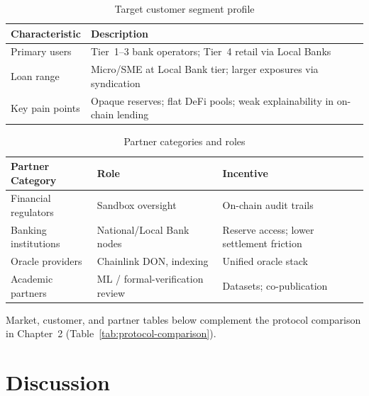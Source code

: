 \documentclass[12pt, a4paper]{report}
\newcommand{\tableheadcolor}{\rowcolor{TableHeadBg}}
\begin{document}
\vspace{2pt}

\begin{table}[H]
\centering
\caption[Target customer segment profile]{Target customer segment profile}
\label{tab:customer-segment-ch5}
\begin{tabular}{p{3.5cm}p{10cm}}
\toprule
\tableheadcolor
\textbf{Characteristic} & \textbf{Description} \\
\midrule
Primary users & Tier~1--3 bank operators; Tier~4 retail via Local Banks \\
Loan range & Micro/SME at Local Bank tier; larger exposures via syndication \\
Key pain points & Opaque reserves; flat DeFi pools; weak explainability in on-chain lending \\
\bottomrule
\end{tabular}
\end{table}

\vspace{2pt}

\begin{table}[H]
\centering
\caption[Partner categories and roles]{Partner categories and roles}
\label{tab:partner-categories-ch5}
\begin{tabular}{p{3.5cm}p{4.5cm}p{5.5cm}}
\toprule
\tableheadcolor
\textbf{Partner Category} & \textbf{Role} & \textbf{Incentive} \\
\midrule
Financial regulators & Sandbox oversight & On-chain audit trails \\
Banking institutions & National/Local Bank nodes & Reserve access; lower settlement friction \\
Oracle providers & Chainlink DON, indexing & Unified oracle stack \\
Academic partners & ML / formal-verification review & Datasets; co-publication \\
\bottomrule
\end{tabular}
\end{table}

\vspace{2pt}

Market, customer, and partner tables below complement the protocol comparison in Chapter~2 (Table~\ref{tab:protocol-comparison}).

\section{Discussion}
\label{sec:ch5-discussion}
\label{sec:research-limitations}
\label{sec:bangladesh-reg}
\end{document}
